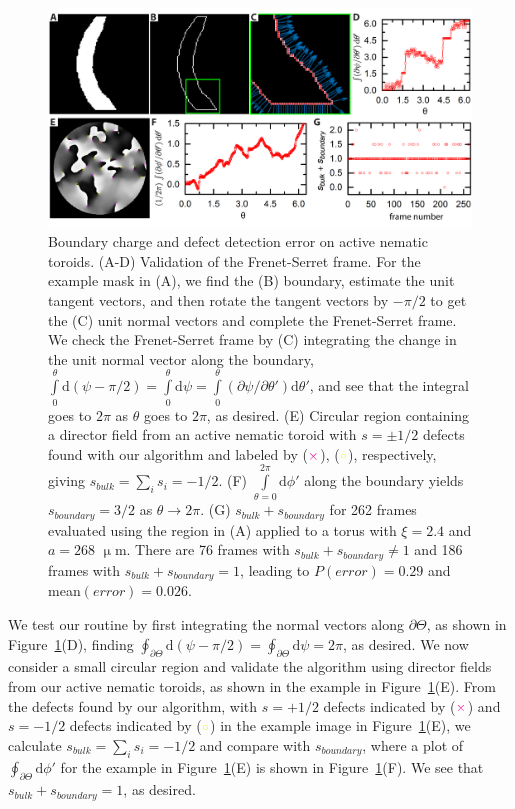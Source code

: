 \begin{figure}
  \centering
  \includegraphics{figures/C3/Ch3-Figs_EdgeChargeErr.png}
  \caption{Boundary charge and defect detection error on active nematic toroids.
  (A-D) Validation of the Frenet-Serret frame.
  For the example mask in (A), we find the (B) boundary, estimate the unit tangent vectors, and then rotate the tangent vectors by $-\pi/2$ to get the (C) unit normal vectors and complete the Frenet-Serret frame.
  We check the Frenet-Serret frame by (C) integrating the change in the unit normal vector along the boundary, $\int\limits_{0}^{\theta} \textrm{d}(\psi - \pi/2) = \int\limits_{0}^{\theta} \textrm{d}\psi = \int\limits_{0}^{\theta} (\partial \psi/\partial \theta') \textrm{d}\theta'$, and see that the integral goes to $2 \pi$ as $\theta$ goes to $2\pi$, as desired.
  (E) Circular region containing a director field from an active nematic toroid with $s = \pm 1/2$ defects found with our algorithm and labeled by (${\color{magenta} \times}$), (${\color{yellow} \circ}$), respectively, giving $s_{bulk} = \sum_i s_i = -1/2$.
  (F) $\int\limits_{\theta = 0}^{2\pi} \textrm{d}\phi'$ along the boundary yields $s_{boundary} = 3/2$ as $\theta \rightarrow 2 \pi$.
  (G) $s_{bulk} + s_{boundary}$ for 262 frames evaluated using the region in (A) applied to a torus with $\xi = 2.4$ and $a = 268$ $\upmu$m.
  There are 76 frames with $s_{bulk} + s_{boundary} \neq 1$ and 186 frames with $s_{bulk} + s_{boundary} = 1$, leading to $P(error) = 0.29$ and mean$(error) = 0.026$.}\label{f:3-EdgeChargeErr}
\end{figure}

We test our routine by first integrating the normal vectors along $\partial \Theta$, as shown in Figure~\ref{f:3-EdgeChargeErr}(D), finding $\oint_{\partial \Theta} \textrm{d}(\psi-\pi/2) = \oint_{\partial \Theta} \textrm{d}\psi = 2\pi$, as desired.
We now consider a small circular region and validate the algorithm using director fields from our active nematic toroids, as shown in the example in Figure~\ref{f:3-EdgeChargeErr}(E).
From the defects found by our algorithm, with $s = +1/2$ defects indicated by (${\color{magenta} \times}$) and $s = -1/2$ defects indicated by (${\color{yellow} \circ}$) in the example image in Figure~\ref{f:3-EdgeChargeErr}(E), we calculate $s_{bulk}= \sum\limits_i s_i=-1/2$ and compare with $s_{boundary}$, where a plot of $\oint_{\partial \Theta} \textrm{d}\phi'$ for the example in Figure~\ref{f:3-EdgeChargeErr}(E) is shown in Figure~\ref{f:3-EdgeChargeErr}(F).
We see that $s_{bulk}+s_{boundary} = 1$, as desired.

